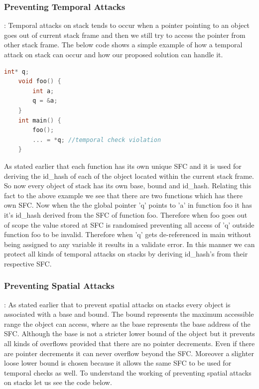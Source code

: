 \subsubsection{Preventing Temporal Attacks} : Temporal attacks on stack tends to occur when a pointer pointing to an object goes out of current stack frame and then we still try to access the pointer from other stack frame. The below code shows a simple example of how a temporal attack on stack can occur and how our proposed solution can handle it. 
\begin{lstlisting}[language=C]
    int* q;
    void foo() {
        int a;
        q = &a;
    }
    int main() {
        foo();
        ... = *q; //temporal check violation
    }
\end{lstlisting}

As stated earlier that each function has its own unique SFC and it is used for deriving the id\_hash of each of the object located within the current stack frame. So now every object of stack has its own base, bound and id\_hash. Relating this fact to the above example we see that there are two functions which has there own SFC. Now when the the global pointer 'q' points to 'a' in function foo it has it's id\_hash derived from the SFC of function foo. Therefore when foo goes out of scope the value stored at SFC is randomised preventing all access of 'q' outside function foo to be invalid. Therefore when 'q' gets de-referenced in main without being assigned to any variable it results in a validate error. In this manner we can protect all kinds of temporal attacks on stacks by deriving id\_hash's from their respective SFC.

\subsubsection{Preventing Spatial Attacks} : As stated earlier that to prevent spatial attacks on stacks every object is associated with a base and bound. The bound represents the maximum accessible range the object can access, where as the base represents the base address of the SFC. Although the base is not a stricter lower bound of the object but it prevents all kinds of overflows provided that there are no pointer decrements. Even if there are pointer decrements it can never overflow beyond the SFC. Moreover a slighter loose lower bound is chosen because it allows the same SFC to be used for temporal checks as well. To understand the working of preventing spatial attacks on stacks let us see the code below.

